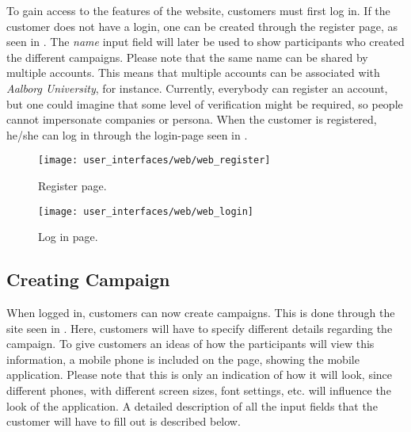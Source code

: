 To gain access to the features of the website, customers must first log in. If the customer does not have a login, one can be created through the register page, as seen in . The \emph{name} input field will later be used to show participants who created the different campaigns. Please note that the same name can be shared by multiple accounts. This means that multiple accounts can be associated with \emph{Aalborg University}, for instance. Currently, everybody can register an account, but one could imagine that some level of verification might be required, so people cannot impersonate companies or persona. When the customer is registered, he/she can log in through the login-page seen in .  

\begin{figure}[!htbp]
\centering
\texttt{[image: user\_interfaces/web/web\_register]}
\caption{Register page.}
\label{fig:web_register}
\end{figure}
\FloatBarrier

\begin{figure}[!htbp]
\centering
\texttt{[image: user\_interfaces/web/web\_login]}
\caption{Log in page.}
\label{fig:web_login}
\end{figure}
\FloatBarrier

\subsection{Creating Campaign}

When logged in, customers can now create campaigns. This is done through the site seen in . Here, customers will have to specify different details regarding the campaign. To give customers an ideas of how the participants will view this information, a mobile phone is included on the page, showing the mobile application. Please note that this is only an indication of how it will look, since different phones, with different screen sizes, font settings, etc. will influence the look of the application. A detailed description of all the input fields that the customer will have to fill out is described below.

